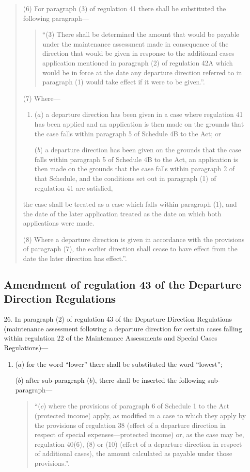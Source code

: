 \documentclass[12pt,a4paper]{article}
\begin{document}
\begin{quotation}
(6) For paragraph (3) of regulation 41 there shall be substituted the following paragraph—
\begin{quotation}
“(3) There shall be determined the amount that would be payable under the maintenance assessment made in consequence of the direction that would be given in response to the additional cases application mentioned in paragraph (2) of regulation 42A which would be in force at the date any departure direction referred to in paragraph (1) would take effect if it were to be given.”.
\end{quotation}

(7) Where—
\begin{enumerate}\item[]
($a$) a departure direction has been given in a case where regulation 41 has been applied and an application is then made on the grounds that the case falls within paragraph 5 of Schedule 4B to the Act; or

($b$) a departure direction has been given on the grounds that the case falls within paragraph 5 of Schedule 4B to the Act, an application is then made on the grounds that the case falls within paragraph 2 of that Schedule, and the conditions set out in paragraph (1) of regulation 41 are satisfied,
\end{enumerate}
the case shall be treated as a case which falls within paragraph (1), and the date of the later application treated as the date on which both applications were made.

(8) Where a departure direction is given in accordance with the provisions of paragraph (7), the earlier direction shall cease to have effect from the date the later direction has effect.”.
\end{quotation}

\subsection[26. Amendment of regulation 43 of the Departure Direction Regulations]{Amendment of regulation 43 of the Departure Direction Regulations}

26.  In paragraph (2) of regulation 43 of the Departure Direction Regulations (maintenance assessment following a departure direction for certain cases falling within regulation 22 of the Maintenance Assessments and Special Cases Regulations)—
\begin{enumerate}\item[]
($a$) for the word “lower” there shall be substituted the word “lowest”;

($b$) after sub-paragraph ($b$), there shall be inserted the following sub-paragraph—
\begin{quotation}
“($c$) where the provisions of paragraph 6 of Schedule 1 to the Act (protected income) apply, as modified in a case to which they apply by the provisions of regulation 38 (effect of a departure direction in respect of special expenses—protected income) or, as the case may be, regulation 40(6), (8) or (10) (effect of a departure direction in respect of additional cases), the amount calculated as payable under those provisions.”.
\end{quotation}
\end{enumerate}
\end{document}
